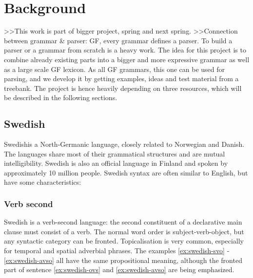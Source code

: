 \documentclass{report}
\begin{document}
\section{Background}  
>>This work is part of bigger project, spring and next spring.
>>Connection between grammar & parser: GF, every grammar defines a parser.
To build a parser or a grammar from scratch is a heavy work. The idea for this
project is to combine already existing parts into a bigger and more expressive grammar
as well as a large scale GF lexicon.
As all GF grammars, this one can be used for parsing, and we develop it by getting
examples, ideas and test material from a treebank.
The project is hence heavily depending on three resources, which will be described
in the following sections.

\subsection{Swedish}
Swedish\cite[Inl. ]{SAG}is a North-Germanic language,
closely related to Norwegian and Danish. The languages share most of their
grammatical structures and are mutual intelligibility. Swedish is also 
an official language in Finland and spoken by approximately 10 million people.
Swedish syntax are often similar to English, but have some characteristics:
\subsubsection*{Verb second}
Swedish is a verb-second language\cite[p. 116]{gunlog}: the
second constituent of a declarative main clause must consist of a verb.
The normal word order is subject-verb-object, but any syntactic category can be
fronted\cite[]{H&H}.
Topicalisation is very common, especially for temporal and spatial adverbial phrases.
The examples \ref{ex:swedish-svo} - \ref{ex:swedish-avso} all have the same propositional
meaning, although the fronted part of sentence \ref{ex:swedish-ovs} and \ref{ex:swedish-avso} are being emphasized.
 \label{ex:swedish-svo}
\vspace{-3mm}
\label{ex:swedish-ovs} 
\vspace{-3mm}
 \label{ex:swedish-avso}
\end{document}
